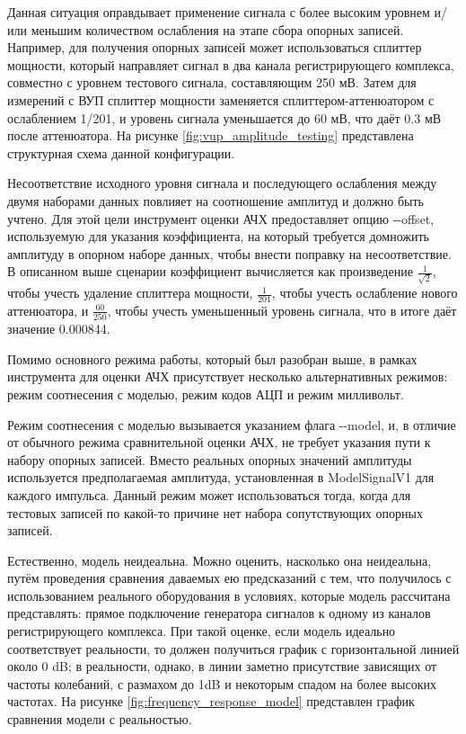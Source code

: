 \documentclass{report}
\begin{document}
Данная ситуация оправдывает применение сигнала с более высоким уровнем и/или меньшим количеством ослабления на этапе сбора опорных записей. Например, для получения опорных записей может использоваться сплиттер мощности, который направляет сигнал в два канала регистрирующего комплекса, совместно с уровнем тестового сигнала, составляющим 250 мВ. Затем для измерений с ВУП сплиттер мощности заменяется сплиттером-аттенюатором с ослаблением 1/201, и уровень сигнала уменьшается до 60 мВ, что даёт 0.3 мВ после аттенюатора. На рисунке \ref{fig:vup_amplitude_testing} представлена структурная схема данной конфигурации.


Несоответствие исходного уровня сигнала и последующего ослабления между двумя наборами данных повлияет на соотношение амплитуд и должно быть учтено. Для этой цели инструмент оценки АЧХ предоставляет опцию -{}-offset, используемую для указания коэффициента, на который требуется домножить амплитуду в опорном наборе данных, чтобы внести поправку на несоответствие. В описанном выше сценарии коэффициент вычисляется как произведение $\frac{1}{\sqrt{2}}$, чтобы учесть удаление сплиттера мощности, $\frac{1}{201}$, чтобы учесть ослабление нового аттенюатора, и $\frac{60}{250}$, чтобы учесть уменьшенный уровень сигнала, что в итоге даёт значение 0.000844.

Помимо основного режима работы, который был разобран выше, в рамках инструмента для оценки АЧХ присутствует несколько альтернативных режимов: режим соотнесения с моделью, режим кодов АЦП и режим милливольт.

Режим соотнесения с моделью вызывается указанием флага -{}-model, и, в отличие от обычного режима сравнительной оценки АЧХ, не требует указания пути к набору опорных записей. Вместо реальных опорных значений амплитуды используется предполагаемая амплитуда, установленная в ModelSignalV1 для каждого импульса. Данный режим может использоваться тогда, когда для тестовых записей по какой-то причине нет набора сопутствующих опорных записей.

Естественно, модель неидеальна. Можно оценить, насколько она неидеальна, путём проведения сравнения даваемых ею предсказаний с тем, что получилось с использованием реального оборудования в условиях, которые модель рассчитана представлять: прямое подключение генератора сигналов к одному из каналов регистрирующего комплекса. При такой оценке, если модель идеально соответствует реальности, то должен получиться график с горизонтальной линией около 0 dB; в реальности, однако, в линии заметно присутствие зависящих от частоты колебаний, с размахом до 1dB и некоторым спадом на более высоких частотах. На рисунке \ref{fig:frequency_response_model} представлен график сравнения модели с реальностью.
\end{document}
